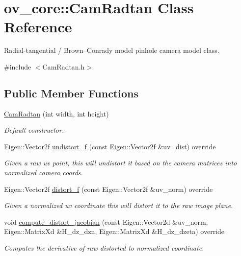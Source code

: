 \hypertarget{classov__core_1_1CamRadtan}{}\section{ov\+\_\+core\+:\+:Cam\+Radtan Class Reference}
\label{classov__core_1_1CamRadtan}


Radial-\/tangential / Brown–\+Conrady model pinhole camera model class.  




{\ttfamily \#include $<$Cam\+Radtan.\+h$>$}

\subsection*{Public Member Functions}
\begin{DoxyCompactItemize}
\item 
\hyperlink{classov__core_1_1CamRadtan_a34a91e335e1767f20e82cc6013a8ccc8}{Cam\+Radtan} (int width, int height)
\begin{DoxyCompactList}\small\item\em Default constructor. \end{DoxyCompactList}\item 
Eigen\+::\+Vector2f \hyperlink{classov__core_1_1CamRadtan_af02fa84ed2fdc895aaaf216184aa25ef}{undistort\+\_\+f} (const Eigen\+::\+Vector2f \&uv\+\_\+dist) override
\begin{DoxyCompactList}\small\item\em Given a raw uv point, this will undistort it based on the camera matrices into normalized camera coords. \end{DoxyCompactList}\item 
Eigen\+::\+Vector2f \hyperlink{classov__core_1_1CamRadtan_a022376b5a15b827bbb7dabebc8df0508}{distort\+\_\+f} (const Eigen\+::\+Vector2f \&uv\+\_\+norm) override
\begin{DoxyCompactList}\small\item\em Given a normalized uv coordinate this will distort it to the raw image plane. \end{DoxyCompactList}\item 
void \hyperlink{classov__core_1_1CamRadtan_a4ab5e54e89f48779a696f5b33d120dbc}{compute\+\_\+distort\+\_\+jacobian} (const Eigen\+::\+Vector2d \&uv\+\_\+norm, Eigen\+::\+Matrix\+Xd \&H\+\_\+dz\+\_\+dzn, Eigen\+::\+Matrix\+Xd \&H\+\_\+dz\+\_\+dzeta) override
\begin{DoxyCompactList}\small\item\em Computes the derivative of raw distorted to normalized coordinate. \end{DoxyCompactList}\end{DoxyCompactItemize}
